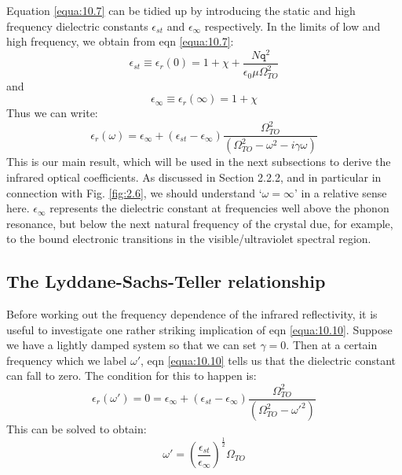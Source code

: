 \documentclass[12pt]{book}
\begin{document}
{Equation \ref{equa:10.7} can be tidied up by introducing the static and high frequency dielectric constants $\epsilon_{st}$ and $\epsilon_{\infty}$ respectively. In the limits of low and high frequency, we obtain from eqn \ref{equa:10.7}:
\begin{equation}\label{equa:10.8}
  \epsilon_{st}\equiv\epsilon_r(0)=1+\chi+\frac{N\texttt{q}^2}{\epsilon_0\mu\Omega_{TO}^2}
\end{equation}
and
\begin{equation}\label{equa:10.9}
  \epsilon_\infty\equiv\epsilon_r(\infty)=1+\chi
\end{equation}
Thus we can write:
\begin{equation}\label{equa:10.10}
  \epsilon_r(\omega)=\epsilon_{\infty}+(\epsilon_{st}-\epsilon_{\infty})\frac{\Omega_{TO}^2}{(\Omega_{TO}^2-\omega^2-i\gamma\omega)}
\end{equation}
This is our main result, which will be used in the next subsections to derive the infrared optical coefficients. As discussed in Section 2.2.2, and in particular in connection with Fig. \ref{fig:2.6}, we should understand `$\omega=\infty$' in a relative sense here. $\epsilon_{\infty}$ represents the dielectric constant at frequencies well above the phonon resonance, but below the next natural frequency of the crystal due, for example, to the bound electronic transitions in the visible/ultraviolet spectral region.

\subsection{The Lyddane-Sachs-Teller relationship}

Before working out the frequency dependence of the infrared reflectivity, it is useful to investigate one rather striking implication of eqn \ref{equa:10.10}. Suppose we have a lightly damped system so that we can set $\gamma=0$. Then at a certain frequency which we label $\omega'$, eqn \ref{equa:10.10} tells us that the dielectric constant can fall to zero. The condition for this to happen is:
\begin{equation}\label{equa:10.11}
  \epsilon_r(\omega')=0=\epsilon_{\infty}+(\epsilon_{st}-\epsilon_{\infty})\frac{\Omega_{TO}^2}{(\Omega_{TO}^2-\omega'^2)}
\end{equation}
This can be solved to obtain:
\begin{equation}\label{equa:10.12}
  \omega'=(\frac{\epsilon_{st}}{\epsilon_{\infty}})^{\frac{1}{2}}\Omega_{TO}
\end{equation}

}
\end{document}
